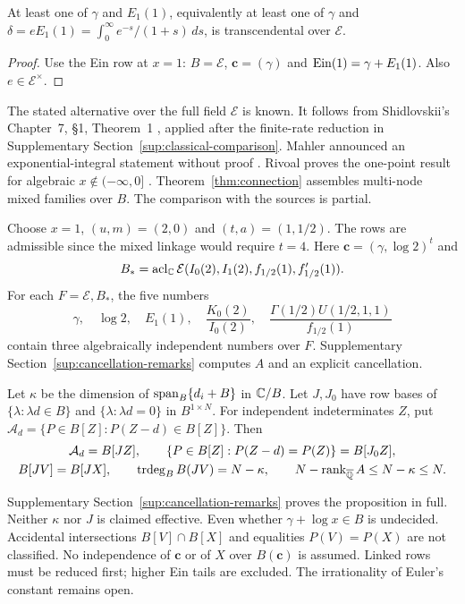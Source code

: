 \begin{corollary}\label{cor:gamma-gompertz}
At least one of $\gamma$ and $E_1(1)$, equivalently at least one of
$\gamma$ and $\delta=eE_1(1)=\int_0^\infty e^{-s}/(1+s)\,ds$,
is transcendental over $\mathcal E$.
\end{corollary}
\begin{proof}
Use the Ein row at $x=1$: $B=\mathcal E$, $\mathbf c=(\gamma)$ and
$\operatorname{Ein}(1)=\gamma+E_1(1)$. Also $e\in\mathcal E^\times$.
\end{proof}
The stated alternative over the full field $\mathcal E$ is known.
It follows from Shidlovskii's Chapter~7, \S1, Theorem~1
\cite[pp.~232--233]{Shidlovskii1989}, applied after the finite-rate
reduction in Supplementary Section~\ref{sup:classical-comparison}.
Mahler announced an exponential-integral statement without proof
\cite[\S23]{Mahler1968}. Rivoal proves the one-point result for
algebraic $x\notin(-\infty,0]$ \cite[Theorem~2(ii), \S7]{Rivoal2012}.
Theorem~\ref{thm:connection} assembles multi-node mixed families over $B$.
The comparison with the sources is partial.

\begin{example}\label{ex:ct2-mixed}
Choose $x=1$, $(u,m)=(2,0)$ and $(t,a)=(1,1/2)$.
The rows are admissible since the mixed linkage would require $t=4$.
Here $\mathbf c=(\gamma,\log2)^t$ and
\[
 B_*=\operatorname{acl}_{\mathbb{C}}\mathcal E
 (I_0(2),I_1(2),f_{1/2}(1),f'_{1/2}(1)).
\]
For each $F=\mathcal E,B_*$, the five numbers
\[
 \gamma,\quad\log2,\quad E_1(1),\quad
 \frac{K_0(2)}{I_0(2)},\quad
 \frac{\Gamma(1/2)U(1/2,1,1)}{f_{1/2}(1)}
\]
contain three algebraically independent numbers over $F$.
Supplementary Section~\ref{sup:cancellation-remarks} computes $A$ and an explicit cancellation.
\end{example}

\begin{proposition}\label{prop:coefficient-cancellation}\label{lem:coefficient-cancellation}
Let $\kappa$ be the dimension of $\operatorname{span}_B\{d_i+B\}$ in $\mathbb{C}/B$.
Let $J,J_0$ have row bases of $\{\lambda:\lambda d\in B\}$ and
$\{\lambda:\lambda d=0\}$ in $B^{1\times N}$.
For independent indeterminates $Z$, put
$\mathcal A_d=\{P\in B[Z]:P(Z-d)\in B[Z]\}$. Then
\begin{equation}\label{eq:ct2-algebra}
\begin{gathered}
 \mathcal A_d=B[JZ],\qquad
 \{P\in B[Z]:P(Z-d)=P(Z)\}=B[J_0Z],\\
 B[JV]=B[JX],\qquad\operatorname{trdeg}_B B(JV)=N-\kappa,\qquad
 N-\operatorname{rank}_{{\overline{\mathbb{Q}}}}A\le N-\kappa\le N.
\end{gathered}
\end{equation}
\end{proposition}
Supplementary Section~\ref{sup:cancellation-remarks} proves the proposition in full.
Neither $\kappa$ nor $J$ is claimed effective. Even whether $\gamma+\log x\in B$ is undecided.
Accidental intersections $B[V]\cap B[X]$ and equalities $P(V)=P(X)$ are not classified.
No independence of $\mathbf c$ or of $X$ over $B(\mathbf c)$ is assumed.
Linked rows must be reduced first; higher Ein tails are excluded.
The irrationality of Euler's constant remains open.
\label{ct2:section-end}
